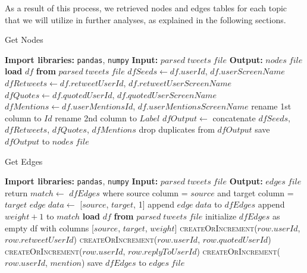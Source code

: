 As a result of this process, we retrieved nodes and edges tables for each topic that we will utilize in further analyses, as explained in the following sections.
\begin{algorithm}[H]
  \caption{Get Nodes}\label{getNodes}
  \begin{algorithmic}[1]
  \State \textbf{Import libraries:} \texttt{pandas}, \texttt{numpy}
  \State \textbf{Input:} $parsed\;tweets\;file$
  \State \textbf{Output:} $nodes\;file$
  \State \textbf{load} $df$ \textbf{from} $parsed\;tweets\;file$
  \State $dfSeeds\gets df.userId$, $df.userScreenName$
  \State $dfRetweets\gets df.retweetUserId$, $df.retweetUserScreenName$
  \State $dfQuotes\gets df.quotedUserId$, $df.quotedUserScreenName$
  \State $dfMentions\gets df.userMentionsId$, $df.userMentionsScreenName$
    \State rename 1st column to $Id$
    \State rename 2nd column to $Label$
  \EndFor
  \State $dfOutput\gets$ concatenate $dfSeeds$, $dfRetweets$, $dfQuotes$, $dfMentions$
  \State drop duplicates from $dfOutput$
  \State save $dfOutput$ to $nodes\;file$
  \end{algorithmic}
\end{algorithm}
\begin{algorithm}[H]
  \caption{Get Edges}\label{getEdges}
  \begin{algorithmic}[1]
  \State \textbf{Import libraries:} \texttt{pandas}, \texttt{numpy}
  \State \textbf{Input:} $parsed\;tweets\;file$
  \State \textbf{Output:} $edges\;file$
      \State return
    \EndIf
    \State $match\gets$ $dfEdges$ where source column = $source$ and target column = $target$
      \State $edge\;data\gets$ [$source$, $target$, 1]
      \State append $edge\;data$ to $dfEdges$
    \Else
      \State append $weight+1$ to $match$
    \EndIf
  \EndProcedure
  \Statex
  \State \textbf{load} $df$ \textbf{from} $parsed\;tweets\;file$
  \State initialize $dfEdges$ as empty df with columns [$source$, $target$, $weight$]
    \State \textsc{createOrIncrement}($row.userId$, $row.retweetUserId$)
    \State \textsc{createOrIncrement}($row.userId$, $row.quotedUserId$)
    \State \textsc{createOrIncrement}($row.userId$, $row.replyToUserId$)
      \State \textsc{createOrIncrement}($row.userId$, $mention$)
    \EndFor
  \EndFor
  \State save $dfEdges$ to $edges\;file$
  \end{algorithmic}
\end{algorithm}

